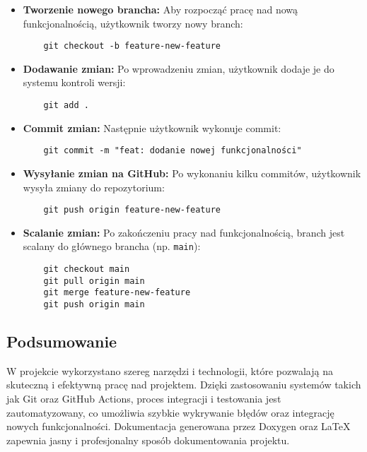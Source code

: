 \begin{itemize}
	\item \textbf{Tworzenie nowego brancha:} Aby rozpocząć pracę nad nową funkcjonalnością, użytkownik tworzy nowy branch:
	      \begin{verbatim}
    git checkout -b feature-new-feature
    \end{verbatim}
	\item \textbf{Dodawanie zmian:} Po wprowadzeniu zmian, użytkownik dodaje je do systemu kontroli wersji:
	      \begin{verbatim}
    git add .
    \end{verbatim}
	\item \textbf{Commit zmian:} Następnie użytkownik wykonuje commit:
	      \begin{verbatim}
    git commit -m "feat: dodanie nowej funkcjonalności"
    \end{verbatim}
	\item \textbf{Wysyłanie zmian na GitHub:} Po wykonaniu kilku commitów, użytkownik wysyła zmiany do repozytorium:
	      \begin{verbatim}
    git push origin feature-new-feature
    \end{verbatim}
	\item \textbf{Scalanie zmian:} Po zakończeniu pracy nad funkcjonalnością, branch jest scalany do głównego brancha (np. \texttt{main}):
	      \begin{verbatim}
    git checkout main
    git pull origin main
    git merge feature-new-feature
    git push origin main
    \end{verbatim}
\end{itemize}

\subsection{Podsumowanie}

W projekcie wykorzystano szereg narzędzi i technologii, które pozwalają na skuteczną i efektywną pracę nad projektem. Dzięki zastosowaniu systemów takich jak Git oraz GitHub Actions, proces integracji i testowania jest zautomatyzowany, co umożliwia szybkie wykrywanie błędów oraz integrację nowych funkcjonalności. Dokumentacja generowana przez Doxygen oraz LaTeX zapewnia jasny i profesjonalny sposób dokumentowania projektu.
